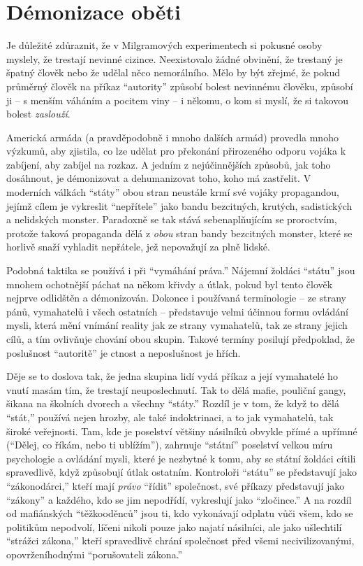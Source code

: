 \documentclass{book}
\begin{document}
\section{Démonizace oběti}

Je důležité zdůraznit, že v Milgramových experimentech si pokusné osoby myslely, že trestají nevinné cizince. Neexistovalo žádné obvinění, že trestaný je špatný člověk nebo že udělal něco nemorálního. Mělo by být zřejmé, že pokud průměrný člověk na příkaz \enquote{autority} způsobí bolest nevinnému člověku, způsobí ji -- s menším váháním a pocitem viny -- i někomu, o kom si myslí, že si takovou bolest \emph{zaslouží}.

Americká armáda (a pravděpodobně i mnoho dalších armád) provedla mnoho výzkumů, aby zjistila, co lze udělat pro překonání přirozeného odporu vojáka k zabíjení, aby zabíjel na rozkaz. A jedním z nejúčinnějších způsobů, jak toho dosáhnout, je démonizovat a dehumanizovat toho, koho má zastřelit. V moderních válkách \enquote{státy} obou stran neustále krmí své vojáky propagandou, jejímž cílem je vykreslit \enquote{nepřítele} jako bandu bezcitných, krutých, sadistických a nelidských monster. Paradoxně se tak stává sebenaplňujícím se proroctvím, protože taková propaganda dělá z \emph{obou} stran bandy bezcitných monster, které se horlivě snaží vyhladit nepřátele, jež nepovažují za plně lidské.

Podobná taktika se používá i při \enquote{vymáhání práva.} Nájemní žoldáci \enquote{státu} jsou mnohem ochotnější páchat na někom křivdy a útlak, pokud byl tento člověk nejprve odlidštěn a démonizován. Dokonce i používaná terminologie -- ze strany pánů, vymahatelů i všech ostatních -- představuje velmi účinnou formu ovládání mysli, která mění vnímání reality jak ze strany vymahatelů, tak ze strany jejich cílů, a tím ovlivňuje chování obou skupin. Takové termíny posilují předpoklad, že poslušnost \enquote{autoritě} je ctnost a neposlušnost je hřích.

Děje se to doslova tak, že jedna skupina lidí vydá příkaz a její vymahatelé ho vnutí masám tím, že trestají neuposlechnutí. Tak to dělá mafie, pouliční gangy, šikana na školních dvorech a všechny \enquote{státy.} Rozdíl je v tom, že když to dělá \enquote{stát,} používá nejen hrozby, ale také indoktrinaci, a to jak vymahatelů, tak široké veřejnosti. Tam, kde je poselství většiny násilníků obvykle přímé a upřímné (\enquote{Dělej, co říkám, nebo ti ublížím}), zahrnuje \enquote{státní} poselství velkou míru psychologie a ovládání mysli, které je nezbytné k tomu, aby se státní žoldáci cítili spravedlivě, když způsobují útlak ostatním. Kontroloři \enquote{státu} se představují jako \enquote{zákonodárci,} kteří mají \emph{právo} \enquote{řídit} společnost, své příkazy představují jako \enquote{zákony} a každého, kdo se jim nepodřídí, vykreslují jako \enquote{zločince.} A na rozdíl od mafiánských \enquote{těžkooděnců} jsou ti, kdo vykonávají odplatu vůči všem, kdo se politikům nepodvolí, líčeni nikoli pouze jako najatí násilníci, ale jako ušlechtilí \enquote{strážci zákona,} kteří spravedlivě chrání společnost před všemi necivilizovanými, opovrženíhodnými \enquote{porušovateli zákona.}
\end{document}

